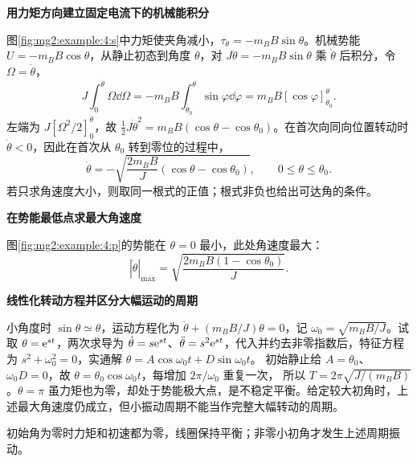 \begin{solution}\textbf{用力矩方向建立固定电流下的机械能积分}\par\nobreak
图\ref{fig:mg2:example:4:s}中力矩使夹角减小，$\tau_\theta=-m_BB\sin\theta$。机械势能 $U=-m_BB\cos\theta$，从静止初态到角度 $\theta$，对 $J\ddot\theta=-m_BB\sin\theta$ 乘 $\dot\theta$ 后积分，令 $\Omega=\dot\theta$，
\[
 J\int_0^{\dot\theta}\Omega\dd\Omega
 =-m_BB\int_{\theta_0}^{\theta}\sin\varphi\dd\varphi
 =m_BB[\cos\varphi]_{\theta_0}^{\theta}.
\]
左端为 $J[\Omega^2/2]_0^{\dot\theta}$，故
$\tfrac12J\dot\theta^2=m_BB(\cos\theta-\cos\theta_0)$。在首次向同向位置转动时 $\dot\theta<0$，因此在首次从 $\theta_0$ 转到零位的过程中，\[\boxed{\dot\theta=-\sqrt{\frac{2m_BB}{J}(\cos\theta-\cos\theta_0)}},\qquad 0\le\theta\le\theta_0.\]若只求角速度大小，则取同一根式的正值；根式非负也给出可达角的条件。



\par\medskip{}\noindent\textbf{在势能最低点求最大角速度}\par\nobreak
图\ref{fig:mg2:example:4:p}的势能在 $\theta=0$ 最小，此处角速度最大：
\[
|\dot\theta|_{\max}=\sqrt{\frac{2m_BB(1-\cos\theta_0)}J}.
\]


\par\medskip{}\noindent\textbf{线性化转动方程并区分大幅运动的周期}\par\nobreak
小角度时 $\sin\theta\simeq\theta$，运动方程化为 $\ddot\theta+(m_BB/J)\theta=0$，记 $\omega_0=\sqrt{m_BB/J}$。试取 $\theta=\mathrm e^{st}$，两次求导为 $\dot\theta=s\mathrm e^{st}$、$\ddot\theta=s^2\mathrm e^{st}$，代入并约去非零指数后，特征方程为
$s^2+\omega_0^2=0$，实通解
$\theta=A\cos\omega_0t+D\sin\omega_0t$。
初始静止给 $A=\theta_0$、$\omega_0D=0$，故
$\theta=\theta_0\cos\omega_0t$，每增加 $2\pi/\omega_0$ 重复一次，
所以 $T=2\pi\sqrt{J/(m_BB)}$。$\theta=\pi$ 虽力矩也为零，却处于势能极大点，是不稳定平衡。给定较大初角时，上述最大角速度仍成立，但小振动周期不能当作完整大幅转动的周期。

初始角为零时力矩和初速都为零，线圈保持平衡；非零小初角才发生上述周期振动。\end{solution}
